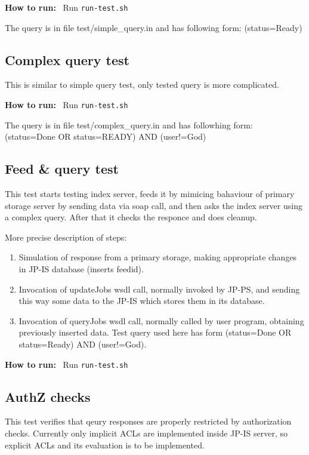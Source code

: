 \documentclass{egee}
\def\how{\noindent\textbf{How to run: }}
\begin{document}
\how\ Run \texttt{run-test.sh}

\begin{hints} 
The query is in file test/simple\_query.in and has following
  form: (status=Ready)
\end{hints}

\subsection{Complex query test}
This is similar to simple query test, only tested query is more complicated.

\how\ Run \texttt{run-test.sh}

\begin{hints}
The query is in file test/complex\_query.in and has followhing
  form: (status=Done OR status=READY) AND (user!=God)
\end{hints}

\subsection{Feed \& query test}
This test starts testing index server, feeds it by
mimicing bahaviour of primary storage server by sending data
via soap call, and then asks the index server using a complex
query. After that it checks the responce and does cleanup.

More precise description of steps:
\begin{enumerate}
 \item Simulation of response from a primary storage, making appropriate
   changes in JP-IS database (inserts feedid).
 \item Invocation of updateJobs wsdl call, normally invoked by JP-PS, and
   sending this way some data to the JP-IS which stores them in its database.
 \item Invocation of queryJobs wsdl call, normally called by user
   program, obtaining previously inserted data. Test query used here has form
   (status=Done OR status=Ready) AND (user!=God).
\end{enumerate}

\how\ Run \texttt{run-test.sh}

\subsection{AuthZ checks}
This test verifies that qeury responses are properly restricted by
authorization checks. Currently only implicit ACLs are implemented
inside JP-IS server, so explicit ACLs and its evaluation is to be implemented.
\end{document}
